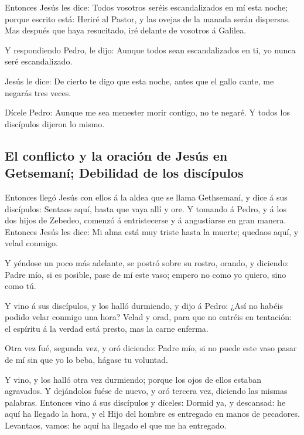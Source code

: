  Entonces Jesús les dice: Todos vosotros seréis
escandalizados en mí esta noche; porque escrito está: Heriré al Pastor,
y las ovejas de la manada serán dispersas.  Mas después que
haya resucitado, iré delante de vosotros á Galilea.

 Y respondiendo Pedro, le dijo: Aunque todos sean
escandalizados en ti, yo nunca seré escandalizado.

 Jesús le dice: De cierto te digo que esta noche, antes que
el gallo cante, me negarás tres veces.

 Dícele Pedro: Aunque me sea menester morir contigo, no te
negaré. Y todos los discípulos dijeron lo mismo.

\hypertarget{el-conflicto-y-la-oraciuxf3n-de-jesuxfas-en-getsemanuxed-debilidad-de-los-discuxedpulos}{%
\subsection{El conflicto y la oración de Jesús en Getsemaní; Debilidad
de los
discípulos}\label{el-conflicto-y-la-oraciuxf3n-de-jesuxfas-en-getsemanuxed-debilidad-de-los-discuxedpulos}}

 Entonces llegó Jesús con ellos á la aldea que se llama
Gethsemaní, y dice á sus discípulos: Sentaos aquí, hasta que vaya allí y
ore.  Y tomando á Pedro, y á los dos hijos de Zebedeo,
comenzó á entristecerse y á angustiarse en gran manera. 
Entonces Jesús les dice: Mi alma está muy triste hasta la muerte;
quedaos aquí, y velad conmigo.

 Y yéndose un poco más adelante, se postró sobre su rostro,
orando, y diciendo: Padre mío, si es posible, pase de mí este vaso;
empero no como yo quiero, sino como tú.

 Y vino á sus discípulos, y los halló durmiendo, y dijo á
Pedro: ¿Así no habéis podido velar conmigo una hora?  Velad
y orad, para que no entréis en tentación: el espíritu á la verdad está
presto, mas la carne enferma.

 Otra vez fué, segunda vez, y oró diciendo: Padre mío, si
no puede este vaso pasar de mí sin que yo lo beba, hágase tu voluntad.

 Y vino, y los halló otra vez durmiendo; porque los ojos de
ellos estaban agravados.  Y dejándolos fuése de nuevo, y
oró tercera vez, diciendo las mismas palabras.  Entonces
vino á sus discípulos y díceles: Dormid ya, y descansad: he aquí ha
llegado la hora, y el Hijo del hombre es entregado en manos de
pecadores.  Levantaos, vamos: he aquí ha llegado el que me
ha entregado.

